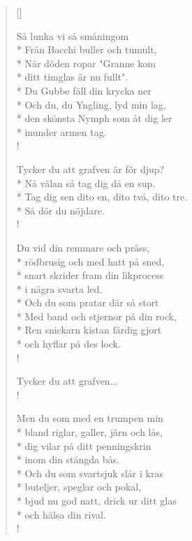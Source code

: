 
\settowidth{\versewidth}{Och du, du Yngling, lyd min lag,}



\begin{verse}[\versewidth]


Så lunka vi så småningom\\*
Från Bacchi buller och tumult,\\*
När döden ropar "Granne kom\\*
ditt timglas är nu fullt".\\*
Du Gubbe fäll din krycka ner\\*
Och du, du Yngling, lyd min lag,\\*
den skönsta Nymph som åt dig ler\\*
inunder armen tag.\\!

Tycker du att grafven är för djup?\\*
Nå välan så tag dig då en sup.\\*
Tag dig sen dito en, dito två, dito tre.\\*
Så dör du nöjdare.\\!

Du vid din remmare och präss,\\*
rödbrusig och med hatt på sned,\\*
snart skrider fram din likprocess\\*
i några svarta led.\\*
Och du som pratar där så stort\\*
Med band och stjernor på din rock,\\*
Ren snickarn kistan färdig gjort\\*
och hyflar på des lock.\\!

Tycker du att grafven...\\!

Men du som med en trumpen min\\*
bland riglar, galler, järn och lås,\\*
dig vilar på ditt penningskrin\\*
inom din stängda bås.\\*
Och du som svartsjuk slår i kras\\*
buteljer, speglar och pokal,\\*
bjud nu god natt, drick ur ditt glas\\*
och hälsa din rival.\\!


\end{verse}
